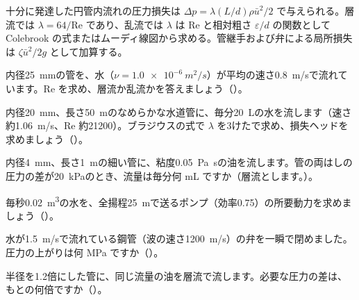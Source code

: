 \begin{senmonsho}[配管の損失の書き方]
\begin{bkhonbun}
十分に発達した円管内流れの圧力損失は $\Delta p=\lambda (L/d)\rho\bar u^2/2$ で与えられる。層流では $\lambda=64/\mathrm{Re}$ であり、乱流では $\lambda$ は $\mathrm{Re}$ と相対粗さ $\varepsilon/d$ の関数として Colebrook の式またはムーディ線図から求める。管継手および弁による局所損失は $\zeta\bar u^2/2g$ として加算する。
\end{bkhonbun}
\end{senmonsho}

\bkendproblems
{}

\bkproblem 内径\qty{25}{mm}の管を、水（$\nu=\qty{1.0e-6}{m^2/s}$）が平均の速さ\qty{0.8}{m/s}で流れています。Re を求め、層流か乱流かを答えましょう（\nobreak{}\nobreak）。

\bkproblem 内径\qty{20}{mm}、長さ\qty{50}{m}のなめらかな水道管に、毎分\qty{20}{L}の水を流します（速さ約\qty{1.06}{m/s}、Re 約\num{21200}）。ブラジウスの式で $\lambda$ を3けたで求め、損失ヘッドを求めましょう（\nobreak{}\nobreak）。

\bkproblem 内径\qty{4}{mm}、長さ\qty{1}{m}の細い管に、粘度\qty{0.05}{Pa.s}の油を流します。管の両はしの圧力の差が\qty{20}{kPa}のとき、流量は毎分何 mL ですか（層流とします。\nobreak）。

\bkproblem 毎秒\qty{0.02}{m^3}の水を、全揚程\qty{25}{m}で送るポンプ（効率0.75）の所要動力を求めましょう（\nobreak{}\nobreak）。

\bkproblem 水が\qty{1.5}{m/s}で流れている鋼管（波の速さ\qty{1200}{m/s}）の弁を一瞬で閉めました。圧力の上がりは何 MPa ですか（\nobreak{}\nobreak）。

\bkproblem 半径を1.2倍にした管に、同じ流量の油を層流で流します。必要な圧力の差は、もとの何倍ですか（\nobreak{}\nobreak）。


